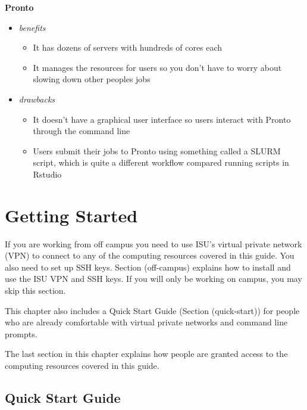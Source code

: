 \documentclass[
]{book}
\providecommand{\tightlist}{%
  \setlength{\itemsep}{0pt}\setlength{\parskip}{0pt}}
\begin{document}
\textbf{Pronto}

\begin{itemize}
\tightlist
\item
  \emph{benefits}

  \begin{itemize}
  \tightlist
  \item
    It has dozens of servers with hundreds of cores each
  \item
    It manages the resources for users so you don't have to worry about slowing down other peoples jobs
  \end{itemize}
\item
  \emph{drawbacks}

  \begin{itemize}
  \tightlist
  \item
    It doesn't have a graphical user interface so users interact with Pronto through the command line
  \item
    Users submit their jobs to Pronto using something called a SLURM script, which is quite a different workflow compared running scripts in Rstudio
  \end{itemize}
\end{itemize}

\hypertarget{getting-started}{%
\chapter{Getting Started}\label{getting-started}}

If you are working from off campus you need to use ISU's virtual private network (VPN) to connect to any of the computing resources covered in this guide. You also need to set up SSH keys. Section (off-campus) explains how to install and use the ISU VPN and SSH keys. If you will only be working on campus, you may skip this section.

This chapter also includes a Quick Start Guide (Section (quick-start)) for people who are already comfortable with virtual private networks and command line prompts.

The last section in this chapter explains how people are granted access to the computing resources covered in this guide.

\hypertarget{quick-start}{%
\section{Quick Start Guide}\label{quick-start}}
\end{document}
